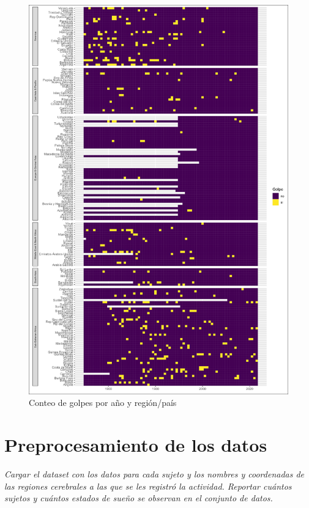 \documentclass{article}
\begin{document}
\begin{figure}[H]
  \centering  
  \includegraphics[width=1\textwidth]{3_golpes_anios.png}
  \caption{Conteo de golpes por año y región/país}
\end{figure}


\section{Preprocesamiento de los datos}

\textit{Cargar el dataset con los datos para cada sujeto y los nombres y 
coordenadas de las regiones cerebrales a las que se les registró la actividad. 
Reportar cuántos sujetos y cuántos estados de sueño se observan en el conjunto de
datos.}

\printbibliography
\end{document}
